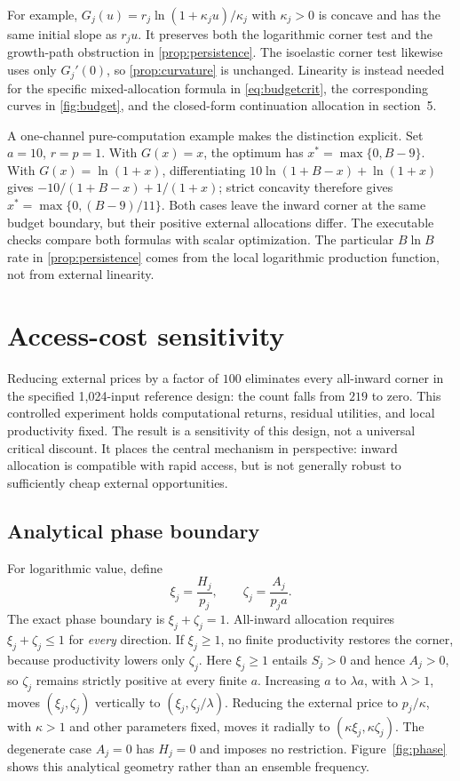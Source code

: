For example, $G_j(u)=r_j\ln(1+\kappa_j u)/\kappa_j$ with
$\kappa_j>0$ is concave and has the same initial slope as $r_ju$.
It preserves both the logarithmic corner test and the growth-path
obstruction in \cref{prop:persistence}. The isoelastic corner test likewise
uses only $G_j'(0)$, so \cref{prop:curvature} is unchanged. Linearity is
instead needed for the specific mixed-allocation formula in
\cref{eq:budgetcrit}, the corresponding curves in \cref{fig:budget},
and the closed-form continuation allocation in section~5.

A one-channel pure-computation example makes the distinction explicit.
Set $a=10$, $r=p=1$. With $G(x)=x$, the optimum has
$x^*=\max\{0,B-9\}$. With $G(x)=\ln(1+x)$, differentiating
$10\ln(1+B-x)+\ln(1+x)$ gives
$-10/(1+B-x)+1/(1+x)$; strict concavity therefore gives
$x^*=\max\{0,(B-9)/11\}$. Both cases leave the inward corner at the
same budget boundary, but their positive external allocations differ.
The executable checks compare both formulas with scalar optimization.
The particular $B\ln B$ rate in \cref{prop:persistence} comes from the
local logarithmic production function, not from external linearity.

\section{Access-cost sensitivity}
\label{sec:access}
Reducing external prices by a factor of $100$ eliminates every all-inward
corner in the specified 1,024-input reference design: the count falls
from $219$ to zero. This controlled experiment holds computational
returns, residual utilities, and local productivity fixed. The result is
a sensitivity of this design, not a universal critical discount. It
places the central mechanism in perspective: inward allocation is
compatible with rapid access, but is not generally robust to sufficiently
cheap external opportunities.

\subsection{Analytical phase boundary}
For logarithmic value, define
\begin{equation}
 \xi_j=\frac{H_j}{p_j},\qquad
 \zeta_j=\frac{A_j}{p_ja}.
 \label{eq:phase-coordinates}
\end{equation}
The exact phase boundary is $\xi_j+\zeta_j=1$. All-inward allocation
requires $\xi_j+\zeta_j\leq1$ for \emph{every} direction.
If $\xi_j\geq1$, no finite productivity restores the corner, because
productivity lowers only $\zeta_j$. Here $\xi_j\geq1$ entails
$S_j>0$ and hence $A_j>0$, so $\zeta_j$ remains strictly positive
at every finite $a$. Increasing $a$ to $\lambda a$, with $\lambda>1$,
moves $(\xi_j,\zeta_j)$ vertically to $(\xi_j,\zeta_j/\lambda)$.
Reducing the external price to $p_j/\kappa$, with $\kappa>1$ and
other parameters fixed, moves it radially to
$(\kappa\xi_j,\kappa\zeta_j)$. The degenerate case $A_j=0$ has $H_j=0$ and imposes no
restriction. Figure~\ref{fig:phase} shows this analytical geometry rather
than an ensemble frequency.

